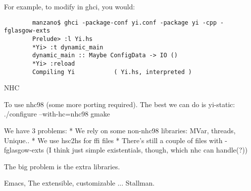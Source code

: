 For example, to modify  in ghci, you would:

\begin{verbatim}
        manzano$ ghci -package-conf yi.conf -package yi -cpp -fglasgow-exts
        Prelude> :l Yi.hs
        *Yi> :t dynamic_main
        dynamic_main :: Maybe ConfigData -> IO ()
        *Yi> :reload
        Compiling Yi           ( Yi.hs, interpreted )
\end{verbatim}

NHC

To use nhc98 (some more porting required). The best we can do is
yi-static:
    ./configure --with-hc=nhc98
    gmake

We have 3 problems:
    * We rely on some non-nhc98 libraries: MVar, threads, Unique..
    * We use hsc2hs for ffi files
    * There's still a couple of files with -fglasgow-exts (I think just
      simple existentials, though, which nhc can handle(?))

The big problem is the extra libraries.

\begin{thebibliography}[50]
\bibitem Emacs, The extensible, customizable ... Stallman.
\end{thebibliography}
